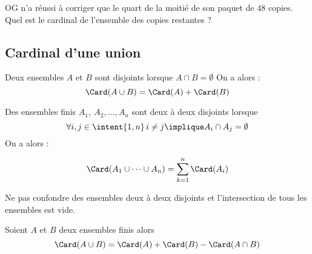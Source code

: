 \documentclass[a4paper, 11pt]{article}
\begin{document}
\begin{exemple}
OG n'a r\'eussi \`a corriger que le quart de la moiti\'e de son paquet de $48$ copies. Quel est le cardinal de l'ensemble des copies restantes ?
\end{exemple}



\subsection{Cardinal d'une union}




\begin{prop} 
Deux ensembles $A$ et $B$ sont disjoints  lorsque $A\cap B=\emptyset$
On a alors : $$\Card(A\cup B) =\Card(A)+\Card(B)$$
\end{prop}






\begin{prop} 
Des ensembles finis $A_1,\ A_2,\dots,A_n$ sont deux \`{a} deux disjoints lorsque 
$$\forall i,j \in \intent{1,n}\, i\neq j \implique A_i \cap A_j =\emptyset$$
On a alors : 

$$\Card(A_1 \cup \cdots \cup A_n)  =\sum_{k=1}^n \Card(A_i)$$
\end{prop}
 



\noindent \warning  Ne pas confondre des ensembles deux \`{a} deux disjoints et l'intersection de tous les ensembles est vide.\\


 



\begin{prop} 
Soient $A$ et $B$ deux ensembles finis alors
$$\Card(A\cup B) =\Card(A) +\Card(B)- \Card(A\cap B)$$

\end{prop}
 



\end{document}
